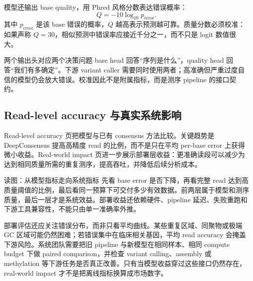 
模型还输出 base quality，用 Phred 风格分数表达错误概率：
$$
Q=-10\log_{10}p_{\mathrm{error}}.
$$
其中 $p_{\mathrm{error}}$ 是该 base 错误的概率，$Q$ 越高表示预测越可靠。质量分数必须校准：如果声称 $Q=30$，相似预测中错误率应接近千分之一，而不只是 logit 数值很大。


\begin{importantbox}{两个输出头对应两个决策问题}
base head 回答“序列是什么”，quality head 回答“我们有多确定”。下游 variant caller 需要同时使用两者；高准确但严重过度自信的模型仍会放大错误。校准因此不是附属指标，而是测序 pipeline 的接口契约。
\end{importantbox}

\subsection{Read-level accuracy 与真实系统影响}

Read-level accuracy 页把模型与已有 consensus 方法比较。关键趋势是 DeepConsensus 提高高精度 read 的比例，而不是只在平均 per-base error 上获得微小收益。Real-world impact 页进一步展示部署层收益：更准确读段可以减少为达到相同质量所需的重复测序，提高吞吐，并降低后续分析成本。



\begin{knowledgebox}{读图：从模型指标走向系统指标}
先看 base error 是否下降，再看完整 read 达到高质量阈值的比例，最后看同一预算下可交付多少有效数据。前两层属于模型和测序质量，最后一层才是系统效益。部署收益还依赖硬件、pipeline 延迟、失败重跑和下游工具兼容性，不能只由单一准确率外推。
\end{knowledgebox}

部署评估还应关注错误分布，而非只看平均曲线。某些重复区域、同聚物或极端 GC 区域可能仍然困难；若错误集中在临床相关基因，平均 read accuracy 会掩盖下游风险。系统团队需要把旧 pipeline 与新模型在相同样本、相同 compute budget 下做 paired comparison，并检查 variant calling、assembly 或 methylation 等下游任务是否真正改善。只有当模型收益穿过这些接口仍然存在，real-world impact 才不是把离线指标换算成市场数字。

